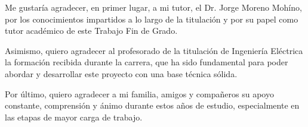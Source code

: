 Me gustaría agradecer, en primer lugar, a mi tutor, el Dr. Jorge Moreno Mohíno, por los conocimientos impartidos a lo largo de la titulación y por su papel como tutor académico de este Trabajo Fin de Grado.

Asimismo, quiero agradecer al profesorado de la titulación de Ingeniería Eléctrica la formación recibida durante la carrera, que ha sido fundamental para poder abordar y desarrollar este proyecto con una base técnica sólida.

Por último, quiero agradecer a mi familia, amigos y compañeros su apoyo constante, comprensión y ánimo durante estos años de estudio, especialmente en las etapas de mayor carga de trabajo.

